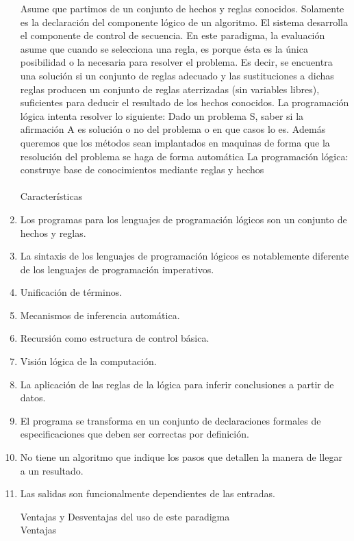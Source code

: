 \begin{enumerate}[1.]
Asume que partimos de un conjunto de hechos y reglas conocidos. Solamente es la declaración del componente lógico de un algoritmo. El sistema desarrolla el componente de control de secuencia. En este paradigma, la evaluación asume que cuando se selecciona una regla, es porque ésta es la única posibilidad o la necesaria para resolver el problema. Es decir, se encuentra una solución si un conjunto de reglas adecuado y las sustituciones a dichas reglas producen un conjunto de reglas aterrizadas (sin variables libres), suficientes para deducir el resultado de los hechos conocidos.
La programación lógica intenta resolver lo siguiente:
Dado un problema S, saber si la afirmación A es solución o no del problema o en que casos lo es. Además queremos que los métodos sean implantados en maquinas de forma que la resolución del problema se haga de forma automática
La programación lógica: construye base de conocimientos mediante reglas y hechos
\\
\\
Características
\\
\item Los programas para los lenguajes de programación lógicos son un conjunto de hechos y reglas.
\item La sintaxis de los lenguajes de programación lógicos es notablemente diferente de los lenguajes de programación imperativos.
\item	Unificación de términos.
\item	Mecanismos de inferencia automática.
\item	Recursión como estructura de control básica.
\item	Visión lógica de la computación.
\item	La aplicación de las reglas de la lógica para inferir conclusiones a partir de datos.
\item	El programa se transforma en un conjunto de declaraciones formales de especificaciones que deben ser correctas por definición.
\item	No tiene un algoritmo que indique los pasos que detallen la manera de llegar a un resultado.
\item	Las salidas son funcionalmente dependientes de las entradas.

Ventajas y Desventajas del uso de este paradigma
\\
Ventajas
\\


\end{enumerate}
